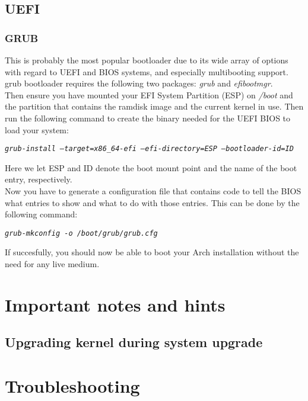 \documentclass{article}
\newcommand{\code}[1]{\begin{center}
		\textit{\texttt{#1}}
\end{center}}
\begin{document}
  \subsection{UEFI}
  \subsubsection{GRUB}
  
  This is probably the most popular bootloader due to its wide array of options with regard to UEFI and BIOS systems, and especially multibooting support.\\
  
  grub bootloader requires the following two packages: \textit{grub} and \textit{efibootmgr}.\\
  
  Then ensure you have mounted your EFI System Partition (ESP) on \textit{/boot} and the partition that contains the ramdisk image and the current kernel in use. Then run the following command to create the binary needed for the UEFI BIOS to load your system:
  
  \code{grub-install --target=x86\_64-efi --efi-directory=ESP --bootloader-id=ID}
  
  Here we let ESP and ID denote the boot mount point and the name of the boot entry, respectively.\\
  
  Now you have to generate a configuration file that contains code to tell the BIOS what entries to show and what to do with those entries. This can be done by the following command:
  
  \code{grub-mkconfig -o /boot/grub/grub.cfg}
  
  If succesfully, you should now be able to boot your Arch installation without the need  for any live medium.\\
  
  \section{Important notes and hints}
  
  \subsection{Upgrading kernel during system upgrade}
  
  
  
  \section{Troubleshooting}
  
  
  
 	 
\end{document}
